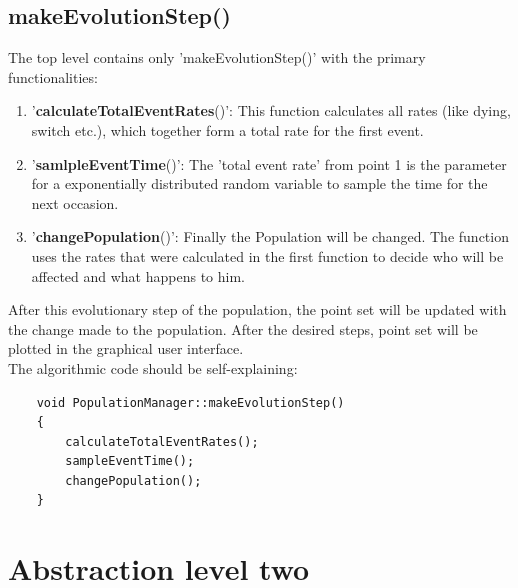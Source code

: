 \documentclass[a4paper,10pt]{scrartcl}
\begin{document}
	\subsection{makeEvolutionStep()}
	The top level contains only 'makeEvolutionStep()' with the primary functionalities:
	\begin{enumerate}
		\item '\textbf{calculateTotalEventRates}()': This function calculates all rates (like dying, switch etc.), which together form a total rate for the first event.
		\item '\textbf{samlpleEventTime}()': The 'total event rate' from point 1 is the parameter for a exponentially distributed random variable to sample the time for the next occasion. 
		\item '\textbf{changePopulation}()': Finally the Population will be changed. The function uses the rates that were calculated in the first function to decide who will be affected and what happens to him. \\
	\end{enumerate}
	After this evolutionary step of the population, the point set will be updated with the change made to the population. After the desired steps, point set will be plotted in the graphical user interface.\\
	The algorithmic code should be self-explaining:
	\begin{lstlisting} 
	void PopulationManager::makeEvolutionStep()
	{
	    calculateTotalEventRates();
	    sampleEventTime();
	    changePopulation();
	}
	\end{lstlisting}

\section{Abstraction level two}
\end{document}
